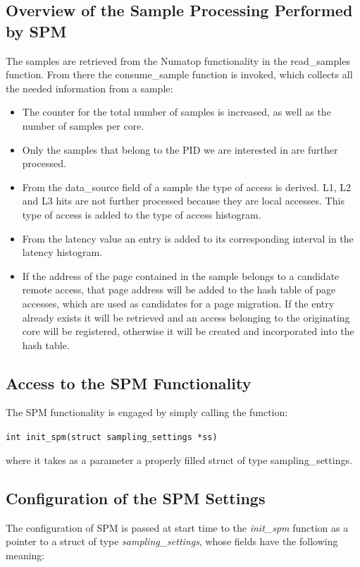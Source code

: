 \subsection{Overview of the Sample Processing Performed by SPM}\label{subsection:ov-samplproc}
The samples are retrieved from the Numatop functionality in the read\_samples function. From there the consume\_sample function is invoked, which collects all the needed information from a sample: 

\begin{itemize}
	\item The counter for the total number of samples is increased, as well as the number of samples per core.
	\item Only the samples that belong to the PID we are interested in are further processed.
	\item From the data\_source field of a sample the type of access is derived. L1, L2 and L3 hits are not further processed because they are local accesses. This type of access is added to the type of access histogram.
	\item From the latency value an entry is added to its corresponding interval in the latency histogram.
	\item If the address of the page contained in the sample belongs to a candidate remote access, that page address will be added to the hash table of page accesses, which are used as candidates for a page migration. If the entry already exists it will be retrieved and an access belonging to the originating core will be registered, otherwise it will be created and incorporated into the hash table.
\end{itemize}



\subsection{Access to the SPM Functionality}\label{subsection:SPM-access}
The SPM functionality is engaged by simply calling the function: 

\begin{center}
\texttt{int init\_spm(struct sampling\_settings *ss)} 
\end{center}

where it takes as a parameter a properly filled struct of type sampling\_settings.

\subsection{Configuration of the SPM Settings}\label{subsection:SPM-settings}
The configuration of SPM is passed at start time to the \textit{init\_spm} function as a pointer to a struct of type \textit{sampling\_settings}, whose fields have the following meaning:

